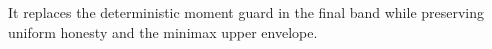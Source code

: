 It replaces the deterministic moment guard in the final band while preserving uniform honesty and the minimax upper envelope.